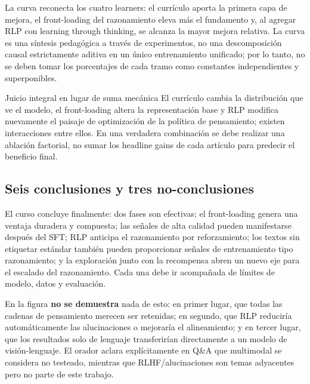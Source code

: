 La curva reconecta los cuatro learners: el currículo aporta la primera capa de mejora, el front-loading del razonamiento eleva más el fundamento y, al agregar RLP con learning through thinking, se alcanza la mayor mejora relativa. La curva es una síntesis pedagógica a través de experimentos, no una descomposición causal estrictamente aditiva en un único entrenamiento unificado; por lo tanto, no se deben tomar los porcentajes de cada tramo como constantes independientes y superponibles.


\begin{importantbox}{Juicio integral en lugar de suma mecánica}
El currículo cambia la distribución que ve el modelo, el front-loading altera la representación base y RLP modifica nuevamente el paisaje de optimización de la política de pensamiento; existen interacciones entre ellos. En una verdadera combinación se debe realizar una ablación factorial, no sumar los headline gains de cada artículo para predecir el beneficio final.
\end{importantbox}

\subsection{Seis conclusiones y tres no-conclusiones}

El curso concluye finalmente: dos fases son efectivas; el front-loading genera una ventaja duradera y compuesta; las señales de alta calidad pueden manifestarse después del SFT; RLP anticipa el razonamiento por reforzamiento; los textos sin etiquetar estándar también pueden proporcionar señales de entrenamiento tipo razonamiento; y la exploración junto con la recompensa abren un nuevo eje para el escalado del razonamiento. Cada una debe ir acompañada de límites de modelo, datos y evaluación.


En la figura \textbf{no se demuestra} nada de esto: en primer lugar, que todas las cadenas de pensamiento merecen ser retenidas; en segundo, que RLP reduciría automáticamente las alucinaciones o mejoraría el alineamiento; y en tercer lugar, que los resultados solo de lenguaje transferirían directamente a un modelo de visión-lenguaje. El orador aclara explícitamente en Q\&A que multimodal se considera no testeado, mientras que RLHF/alucinaciones son temas adyacentes pero no parte de este trabajo.

